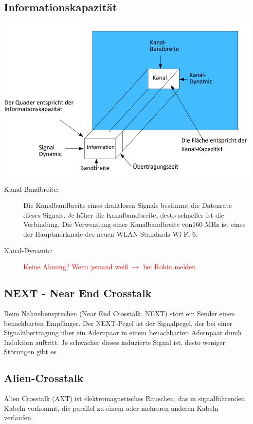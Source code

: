 \documentclass[12pt,a4paper]{article}
\begin{document}
		\subsection{Informationskapazität}
		\includegraphics[width=\textwidth]{Bilder/Informationskapazitaet.png}
		\begin{description}
			\item[Kanal-Bandbreite: ] Die Kanalbandbreite eines drahtlosen Signals bestimmt die Datenrate dieses Signals. Je höher die Kanalbandbreite, desto schneller ist die Verbindung. Die Verwendung einer Kanalbandbreite von160 MHz ist eines der Hauptmerkmale des neuen WLAN-Standards Wi-Fi 6.
			\item[Kanal-Dynamic: ] \textcolor{red}{Keine Ahnung? Wenn jemand weiß $\rightarrow$ bei Robin melden}
		\end{description}

		\subsection{NEXT - Near End Crosstalk}
		Beim Nahnebensprechen (Near End Crosstalk, NEXT) stört ein Sender einen benachbarten Empfänger. Der NEXT-Pegel ist der Signalpegel, der bei einer Signalübertragung über ein Adernpaar in einem benachbarten Adernpaar durch Induktion auftritt. Je schwächer dieses induzierte Signal ist, desto weniger Störungen gibt es.

		\subsection{Alien-Crosstalk}
			Alien Crosstalk (AXT) ist elektromagnetisches Rauschen, das in signalführenden Kabeln vorkommt, die parallel zu einem oder mehreren anderen Kabeln verlaufen.
\end{document}
